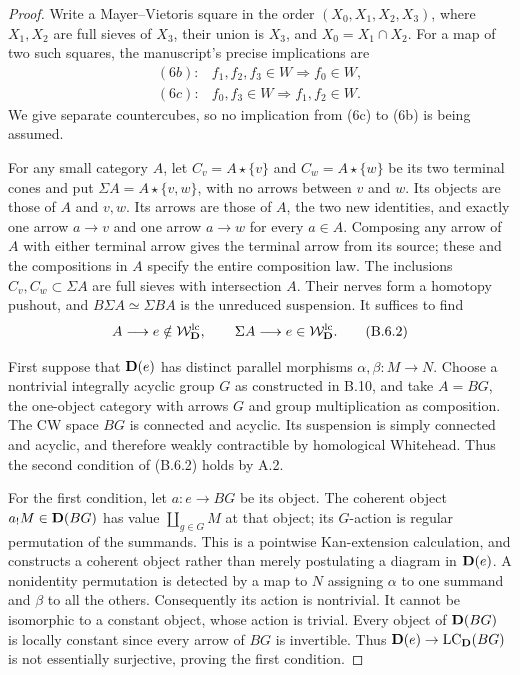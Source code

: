 \begin{proof}
Write a Mayer--Vietoris square in the order
$(X_0,X_1,X_2,X_3)$, where $X_1,X_2$ are full sieves of
$X_3$, their union is $X_3$, and $X_0=X_1\cap X_2$.
For a map of two such squares, the manuscript's precise
implications are
\[
\begin{array}{ll}
 (6b):& f_1,f_2,f_3\in W\Longrightarrow f_0\in W,\\
 (6c):& f_0,f_3\in W\Longrightarrow f_1,f_2\in W.
\end{array}
\tag{B.6.1}
\]
We give separate countercubes, so no implication from (6c)
to (6b) is being assumed.

For any small category $A$, let $C_v=A\star\{v\}$ and
$C_w=A\star\{w\}$ be its two terminal cones and put
$\Sigma A=A\star\{v,w\}$, with no arrows between $v$ and
$w$. Its objects are those of $A$ and $v,w$. Its arrows
are those of $A$, the two new identities, and exactly one
arrow $a\to v$ and one arrow $a\to w$ for every $a\in A$.
Composing any arrow of $A$ with either terminal arrow gives
the terminal arrow from its source; these and the compositions
in $A$ specify the entire composition law. The inclusions
$C_v,C_w\subset\Sigma A$ are full sieves with intersection
$A$. Their nerves form a homotopy pushout, and
$B\Sigma A\simeq\Sigma BA$ is the unreduced suspension.
It suffices to find
\[
 A\longrightarrow e\notin\mathcal W_{\mathbf D}^{\mathrm{lc}},
 \qquad \Sigma A\longrightarrow e\in\mathcal W_{\mathbf D}^{\mathrm{lc}}.
\tag{B.6.2}
\]

First suppose that $\mathbf D(e)$ has distinct parallel morphisms
$\alpha,\beta:M\to N$. Choose a nontrivial integrally acyclic
group $G$ as constructed in B.10, and take $A=BG$, the
one-object category with arrows $G$ and group multiplication
as composition. The CW space $BG$ is connected and acyclic.
Its suspension is simply connected and acyclic, and therefore
weakly contractible by homological Whitehead. Thus the second
condition of (B.6.2) holds by A.2.

For the first condition, let $a:e\to BG$ be its object.
The coherent object $a_!M\in\mathbf D(BG)$ has value
$\coprod_{g\in G}M$ at that object; its $G$-action is regular
permutation of the summands. This is a pointwise Kan-extension
calculation, and constructs a coherent object rather than
merely postulating a diagram in $\mathbf D(e)$. A nonidentity
permutation is detected by a map to $N$ assigning $\alpha$
to one summand and $\beta$ to all the others. Consequently
its action is nontrivial. It cannot be isomorphic to a
constant object, whose action is trivial. Every object of
$\mathbf D(BG)$ is locally constant since every arrow of $BG$ is
invertible. Thus $\mathbf D(e)\to\operatorname{LC}_\mathbf D(BG)$ is not essentially
surjective, proving the first condition.


\end{proof}

